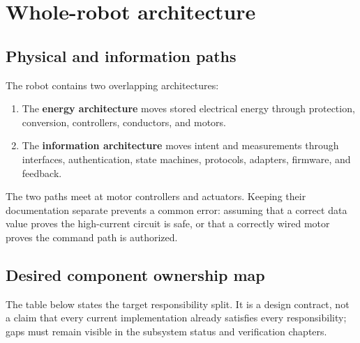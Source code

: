 \documentclass[10pt,openany]{book}
\begin{document}


\chapter{Whole-robot architecture}

\ROBControlStackDiagram

\section{Physical and information paths}

The robot contains two overlapping architectures:

\begin{enumerate}
  \item The \textbf{energy architecture} moves stored electrical energy through protection, conversion, controllers, conductors, and motors.
  \item The \textbf{information architecture} moves intent and measurements through interfaces, authentication, state machines, protocols, adapters, firmware, and feedback.
\end{enumerate}

The two paths meet at motor controllers and actuators. Keeping their documentation separate prevents a common error: assuming that a correct data value proves the high-current circuit is safe, or that a correctly wired motor proves the command path is authorized.

\section{Desired component ownership map}

The table below states the target responsibility split. It is a design contract, not a claim that every current implementation already satisfies every responsibility; gaps must remain visible in the subsystem status and verification chapters.
\end{document}
